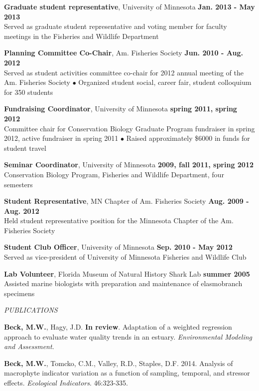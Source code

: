 \documentclass[letterpaper,12pt]{article}
\newcommand{\sectitle}[1]{\vspace{\baselineskip} \centerline{\large{\textit{#1}}}}
\begin{document}
{\bf Graduate student representative}, University of Minnesota \hfill {\bf Jan. 2013 - May 2013} \\
Served as graduate student representative and voting member for faculty meetings in the Fisheries and Wildlife Department

{\bf Planning Committee Co-Chair}, Am. Fisheries Society \hfill {\bf Jun. 2010 - Aug. 2012} \\
Served as student activities committee co-chair for 2012 annual meeting of the Am. Fisheries Society $\bullet$ Organized student social, career fair, student colloquium for 350 students

{\bf Fundraising Coordinator}, University of Minnesota \hfill {\bf spring 2011, spring 2012} \\
Committee chair for Conservation Biology Graduate Program fundraiser in spring 2012, active fundraiser in spring 2011 $\bullet$ Raised approximately \$6000 in funds for student travel

{\bf Seminar Coordinator}, University of Minnesota \hfill {\bf 2009, fall 2011, spring 2012} \\
Conservation Biology Program, Fisheries and Wildlife Department, four semesters

{\bf Student Representative}, MN Chapter of Am. Fisheries Society \hfill {\bf Aug. 2009 - Aug. 2012} \\
Held student representative position for the Minnesota Chapter of the Am. Fisheries Society

{\bf Student Club Officer}, University of Minnesota \hfill {\bf Sep. 2010 - May 2012} \\
Served as vice-president of University of Minnesota Fisheries and Wildlife Club

{\bf Lab Volunteer}, Florida Museum of Natural History Shark Lab \hfill {\bf summer 2005} \\
Assisted marine biologists with preparation and maintenance of elasmobranch specimens

\sectitle{PUBLICATIONS}

\textbf{Beck, M.W.}, Hagy, J.D. {\bf In review}. Adaptation of a weighted regression approach to evaluate water quality trends in an estuary. \textit{Environmental Modeling and Assessment}.

\textbf{Beck, M.W.}, Tomcko, C.M., Valley, R.D., Staples, D.F. 2014. Analysis of macrophyte indicator variation as a function of sampling, temporal, and stressor effects. \textit{Ecological Indicators}. 46:323-335.
\end{document}
